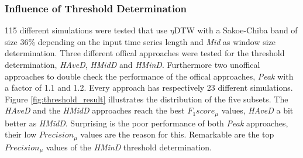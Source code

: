 \subsubsection{Influence of Threshold Determination} \label{influence_of_threshold_determination}
115 different simulations were tested that use $\eta$DTW with a Sakoe-Chiba band of size 36\% depending on the
input time series length and \textit{Mid} as window size determination. Three different offical approaches were
tested for the threshold determination, \textit{HAveD}, \textit{HMidD} and \textit{HMinD}. Furthermore two unoffical
approaches to double check the performance of the offical approaches, \textit{Peak} with a factor of 1.1 and 1.2. Every
approach has respectively 23 different simulations. Figure \ref{fig:threshold_result} illustrates the distribution of
the five subsets. The \textit{HAveD} and the \textit{HMidD} approaches reach the best $F_{1}score_{\mu}$ values,
\textit{HAveD} a bit better as \textit{HMidD}. Surprising is the poor performance of both \textit{Peak} approaches,
their low $Precision_{\mu}$ values are the reason for this. Remarkable are the top $Precision_{\mu}$ values of the
\textit{HMinD} threshold determination.

